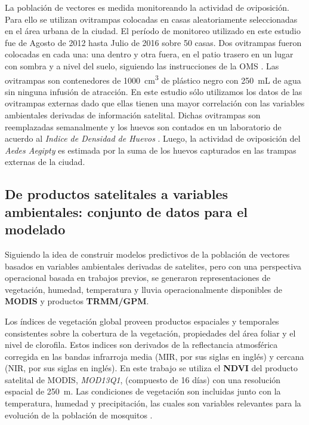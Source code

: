   \par La población de vectores es medida monitoreando la actividad de oviposición.
    Para ello se utilizan ovitrampas colocadas en casas aleatoriamente seleccionadas
    en el área urbana de la ciudad. El período de monitoreo utilizado en este
    estudio fue de Agosto de 2012 hasta Julio de 2016 sobre 50 casas. Dos
    ovitrampas fueron colocadas en cada una: una dentro y otra fuera,
    en el patio trasero en un lugar con sombra y a nivel del suelo, siguiendo
    las instrucciones de la OMS \cite{peridomestic}. Las ovitrampas son contenedores
    de \SI{1000}{\centi\meter\cubed} de plástico negro con \SI{250}{\milli\liter}
    de agua sin ninguna infusión de atracción.
    En este estudio sólo utilizamos los datos de las ovitrampas externas dado
    que ellas tienen una mayor correlación con las variables ambientales
    derivadas de información satelital. Dichas ovitrampas son reemplazadas
    semanalmente y los huevos son contados en un laboratorio de acuerdo al
    \textit{Indice de Densidad de Huevos} \cite{indice_huevos}. Luego, la
    actividad de oviposición del \textit{Aedes Aegipty} es estimada por la suma
    de los huevos capturados en las trampas externas de la ciudad.



\subsection{De productos satelitales a variables ambientales: conjunto de datos para el modelado}

  \par Siguiendo la idea de construir modelos predictivos de la población de
    vectores basados en variables ambientales derivadas de satelites, pero con una
    perspectiva operacional basada en trabajos previos, se generaron representaciones
    de vegetación, humedad, temperatura y lluvia operacionalmente disponibles
    de \textbf{MODIS} y productos \textbf{TRMM/GPM}.

  \par Los índices de vegetación global proveen productos espaciales y
    temporales consistentes sobre la cobertura de la vegetación,
    propiedades del área foliar y el nivel de clorofila. Estos indices son
    derivados de la reflectancia atmosférica
    corregida en las bandas infrarroja media (MIR, por sus siglas en inglés) y
    cercana (NIR, por sus siglas en inglés).
    En este trabajo se utiliza el \textbf{NDVI} del producto satelital
    de MODIS, \textit{MOD13Q1}, (compuesto de 16 días) con una resolución espacial de
    \SI{250}{\meter}.
    Las condiciones de vegetación son incluidas junto con la temperatura,
    humedad y precipitación, las cuales son variables relevantes para la evolución de la
    población de mosquitos \cite{ndwi_erffectiveness, rs_invertebrate}.

